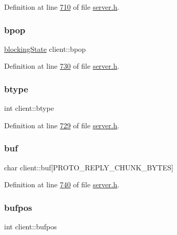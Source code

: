 Definition at line \hyperlink{server_8h_source_l00710}{710} of file \hyperlink{server_8h_source}{server.\+h}.

\mbox{\label{structclient_aa2fa244d70ff203607b59b61dc52330e}} 
\subsubsection{\texorpdfstring{bpop}{bpop}}
{\footnotesize\ttfamily \hyperlink{structblockingState}{blocking\+State} client\+::bpop}



Definition at line \hyperlink{server_8h_source_l00730}{730} of file \hyperlink{server_8h_source}{server.\+h}.

\mbox{\label{structclient_a9c1e9d99dd335a598d556a0b940491d3}} 
\subsubsection{\texorpdfstring{btype}{btype}}
{\footnotesize\ttfamily int client\+::btype}



Definition at line \hyperlink{server_8h_source_l00729}{729} of file \hyperlink{server_8h_source}{server.\+h}.

\mbox{\label{structclient_a3566e777060a8cdb289a0f585bea72cd}} 
\subsubsection{\texorpdfstring{buf}{buf}}
{\footnotesize\ttfamily char client\+::buf\mbox{[}P\+R\+O\+T\+O\+\_\+\+R\+E\+P\+L\+Y\+\_\+\+C\+H\+U\+N\+K\+\_\+\+B\+Y\+T\+ES\mbox{]}}



Definition at line \hyperlink{server_8h_source_l00740}{740} of file \hyperlink{server_8h_source}{server.\+h}.

\mbox{\label{structclient_a43d6f0929a1c0f187c06b5f777c8f1b7}} 
\subsubsection{\texorpdfstring{bufpos}{bufpos}}
{\footnotesize\ttfamily int client\+::bufpos}



